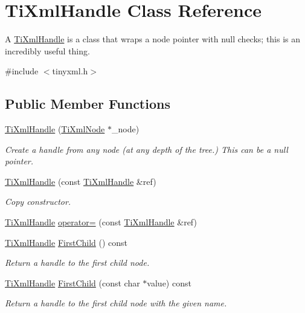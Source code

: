 \hypertarget{class_ti_xml_handle}{
\section{TiXmlHandle Class Reference}
\label{class_ti_xml_handle}
}


A \hyperlink{class_ti_xml_handle}{TiXmlHandle} is a class that wraps a node pointer with null checks; this is an incredibly useful thing.  




{\ttfamily \#include $<$tinyxml.h$>$}

\subsection*{Public Member Functions}
\begin{DoxyCompactItemize}
\item 
\hyperlink{class_ti_xml_handle_aba18fd7bdefb942ecdea4bf4b8e29ec8}{TiXmlHandle} (\hyperlink{class_ti_xml_node}{TiXmlNode} $\ast$\_\-node)
\begin{DoxyCompactList}\small\item\em Create a handle from any node (at any depth of the tree.) This can be a null pointer. \end{DoxyCompactList}\item 
\hyperlink{class_ti_xml_handle_a236d7855e1e56ccc7b980630c48c7fd7}{TiXmlHandle} (const \hyperlink{class_ti_xml_handle}{TiXmlHandle} \&ref)
\begin{DoxyCompactList}\small\item\em Copy constructor. \end{DoxyCompactList}\item 
\hyperlink{class_ti_xml_handle}{TiXmlHandle} \hyperlink{class_ti_xml_handle_ad8e5dcf6a87882674203157f29f8e4db}{operator=} (const \hyperlink{class_ti_xml_handle}{TiXmlHandle} \&ref)
\item 
\hyperlink{class_ti_xml_handle}{TiXmlHandle} \hyperlink{class_ti_xml_handle_acdb1faaf88a700b40ca2c8d9aee21139}{FirstChild} () const 
\begin{DoxyCompactList}\small\item\em Return a handle to the first child node. \end{DoxyCompactList}\item 
\hyperlink{class_ti_xml_handle}{TiXmlHandle} \hyperlink{class_ti_xml_handle_a8c61f64ae9365d89c264f289085541f8}{FirstChild} (const char $\ast$value) const 
\begin{DoxyCompactList}\small\item\em Return a handle to the first child node with the given name. \end{DoxyCompactList}\item 

\end{DoxyCompactItemize}
